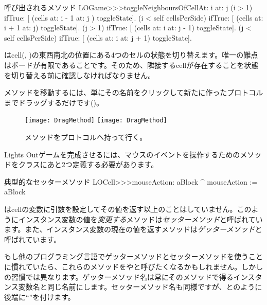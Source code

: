 \documentclass[a4paper,10pt,twoside]{book}
\begin{document}
\begin{method}[toggleNeighboursOfCellAt:at:]{呼び出されるメソッド}
LOGame>>>toggleNeighboursOfCellAt: i at: j
   (i > 1) ifTrue: [ (cells at: i - 1 at: j ) toggleState].
   (i < self cellsPerSide) ifTrue: [ (cells at: i + 1 at: j) toggleState].
   (j > 1) ifTrue: [ (cells at: i  at: j - 1) toggleState].
   (j < self cellsPerSide) ifTrue: [ (cells at: i at: j + 1) toggleState].
\end{method}

 はcell(, )の東西南北の位置にある4つのセルの状態を切り替えます。唯一の難点はボードが有限であることです。そのため、隣接するcellが存在することを状態を切り替える前に確認しなければなりません。


メソッドを移動するには、単にその名前をクリックして新たに作ったプロトコルまでドラッグするだけです()。

\begin{figure}[htbp]
   \centering
   \ifluluelse
		{\texttt{[image: DragMethod]} }
		{\texttt{[image: DragMethod]} }
   \caption{メソッドをプロトコルへ持って行く。}
\end{figure}

Lights Outゲームを完成させるには、マウスのイベントを操作するためのメソッドをクラスにあと2つ定義する必要があります。

\begin{method}[mouseAction:]{典型的なセッターメソッド}
LOCell>>>mouseAction: aBlock
   ^ mouseAction := aBlock
\end{method}

 はcellの変数に引数を設定してその値を返す以上のことはしていません。このようにインスタンス変数の値を\emph{変更する}メソッドは\emph{セッターメソッド}と呼ばれています。また、インスタンス変数の現在の値を返すメソッドは\emph{ゲッターメソッド}と呼ばれています。

もし他のプログラミング言語でゲッターメソッドとセッターメソッドを使うことに慣れていたら、これらのメソッドをやと呼びたくなるかもしれません。しかし\st の習慣では異なります。ゲッターメソッド名は常にそのメソッドで得るインスタンス変数名と同じ名前にします。セッターメソッド名も同様ですが、とのように後端に``\ct{:}''を付けます。
\end{document}
